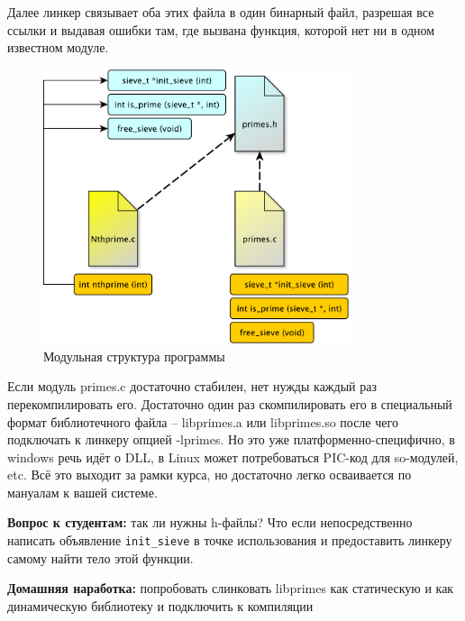\documentclass[a4paper,12pt,oneside]{book}
\newif\ifanswers
\begin{document}
Далее линкер связывает оба этих файла в один бинарный файл, разрешая все ссылки и выдавая ошибки там, где вызвана функция, которой нет ни в одном известном модуле.

\begin{figure}[ht]
\centering
\includegraphics[width=0.8\textwidth]{illustrations/module-structure-crop.pdf}
\caption{Модульная структура программы}
\label{fig:module_struct}
\end{figure}

Если модуль primes.c достаточно стабилен, нет нужды каждый раз перекомпилировать его. Достаточно один раз скомпилировать его в специальный формат библиотечного файла -- libprimes.a или libprimes.so после чего подключать к линкеру опцией -lprimes. Но это уже платформенно-специфично, в windows речь идёт о DLL, в Linux может потребоваться PIC-код для so-модулей, etc. Всё это выходит за рамки курса, но достаточно легко осваивается по мануалам к вашей системе.

\textbf{Вопрос к студентам:} так ли нужны h-файлы? Что если непосредственно написать объявление \lstinline!init_sieve! в точке использования и предоставить линкеру самому найти тело этой функции.

\ifanswers
Правильный ответ: формально да, так можно сделать. Но реально единые заголовочники помогают бороться с человеческими ошибками. Когда изменяются типы параметров в точке определения, компилятор подскажет несоответствие заголовочнику и все места где их надо изменить в точке использования. Если же заголовочника не будет а программист забудет это сделать, будет тихое UB
\fi

\textbf{Домашняя наработка:} попробовать слинковать libprimes как статическую и как динамическую библиотеку и подключить к компиляции
\end{document}
